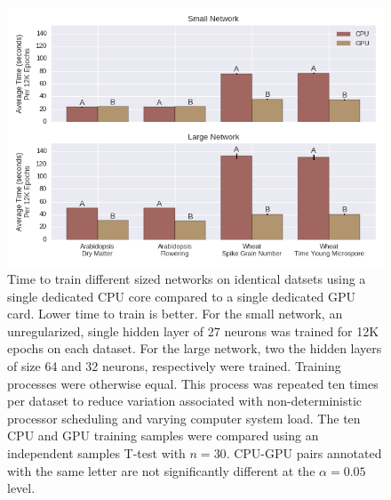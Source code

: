 
\begin{figure}[htbp]
\renewcommand{\familydefault}{\sfdefault}\normalfont
\centering 
\includegraphics[width=\linewidth]{g3_article/figures/time_comparison.png}
    \caption{Time to train different sized networks on identical datsets using a single dedicated CPU core
             compared to a single dedicated GPU card. Lower time to train is better. For the small network, 
             an unregularized, single hidden layer of 27 neurons was trained for 12K epochs on each dataset. 
             For the large network, two the hidden layers of size 64 and 32 neurons, respectively were trained. 
             Training processes were otherwise equal. This process was repeated ten times per dataset to 
             reduce variation associated with non-deterministic processor scheduling and varying computer system load.
             The ten CPU and GPU training samples were compared using an independent samples T-test with $n=30$. 
             CPU-GPU pairs annotated with the same letter are not significantly different 
             at the $\alpha=0.05$ level.}
\label{fig:time-comparison}
\end{figure}
